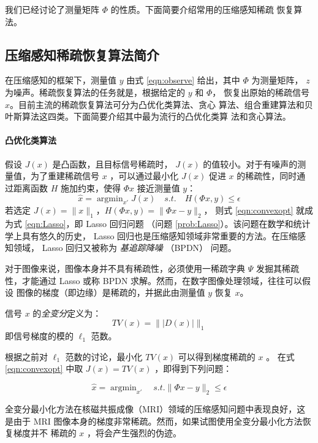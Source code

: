 我们已经讨论了测量矩阵 $\Phi$ 的性质。下面简要介绍常用的压缩感知稀疏
恢复算法。

\subsection{压缩感知稀疏恢复算法简介}

在压缩感知的框架下，测量值 $y$ 由式 \ref{eqn:observe} 给出，其中 $\Phi$
为测量矩阵， $z$ 为噪声。稀疏恢复算法的任务就是，根据给定的 $y$ 和 $\Phi$，
恢复出原始的稀疏信号 $x$。目前主流的稀疏恢复算法可分为凸优化类算法、贪心
算法、组合重建算法和贝叶斯算法这四类。下面简要介绍其中最为流行的凸优化类算
法和贪心算法。

\paragraph{凸优化类算法} 假设 $J(x)$ 是凸函数，且目标信号稀疏时， $J(x)$
的值较小。对于有噪声的测量值，为了重建稀疏信号 $x$ ，可以通过最小化 $J(x)$
促进 $x$ 的稀疏性，同时通过距离函数 $H$ 施加约束，使得 $\Phi x$ 接近测量值
$y$：
\begin{equation} \label{eqn:convexopt}
\hat x = \mathop{\arg \min}_{x'} J(x) \quad s.t. \quad H(\Phi x, y) \leq
\epsilon
\end{equation}
若选定 $J(x) = \|x\|_1$，$H(\Phi x, y) = \|\Phi x - y\|_2$，
则式 \ref{eqn:convexopt} 就成为式 \ref{eqn:Lasso}，即 Lasso 回归问题
（问题 \ref{prob:Lasso}）。该问题在数学和统计学上具有悠久的历史， Lasso
回归也是压缩感知领域非常重要的方法。在压缩感知领域， Lasso 回归又被称为
\emph{基追踪降噪} （BPDN） 问题。

对于图像来说，图像本身并不具有稀疏性，必须使用一稀疏字典 $\Psi$ 发掘其稀疏
性，才能通过 Lasso 或称 BPDN 求解。然而，在数字图像处理领域，往往可以假设
图像的梯度（即边缘）是稀疏的，并据此由测量值 $y$ 恢复 $x$。
\begin{definition} [全变分]
信号 $x$ 的\emph{全变分}定义为：
\begin{equation}
TV(x) = \| |D(x)| \|_1
\end{equation}
即信号梯度的模的 $\ell_1$ 范数。
\end{definition}

根据之前对 $\ell_1$ 范数的讨论，最小化 $TV(x)$ 可以得到梯度稀疏的 $x$ 。
在式 \ref{eqn:convexopt} 中取 $J(x) = TV(x)$ ，即得到下列问题：
\begin{problem}
\begin{equation}
\hat x = \mathop{\arg \min}_{x'} \quad s.t. \|\Phi x - y\|_2 \leq \epsilon
\end{equation}
\end{problem}
全变分最小化方法在核磁共振成像（MRI）领域的压缩感知问题中表现良好，这是由于
MRI 图像本身的梯度非常稀疏。然而，如果试图使用全变分最小化方法恢复梯度并不
稀疏的 $x$ ，将会产生强烈的伪迹。

